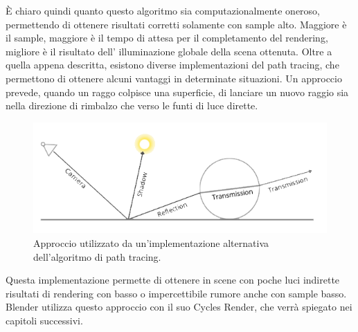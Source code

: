 È chiaro quindi quanto questo algoritmo sia computazionalmente oneroso, permettendo di ottenere risultati corretti solamente con sample alto. Maggiore è il sample, maggiore è il tempo di attesa per il completamento del rendering, migliore è il risultato dell’ illuminazione globale della scena ottenuta.
Oltre a quella appena descritta, esistono diverse implementazioni del path tracing, che permettono di ottenere alcuni vantaggi in determinate situazioni.
Un approccio prevede, quando un raggo colpisce una superficie, di lanciare un nuovo raggio sia nella direzione di rimbalzo che verso le funti di luce dirette.
\\
\begin{figure}[htb]
 \centering
 \includegraphics[width=0.8\linewidth]{images/chapter_stato_arte/stato_arte_path_alt.png}\hfill
 \caption[Path Tracing: implementazioni alternative]{Approccio utilizzato da un'implementazione alternativa dell'algoritmo di path tracing.}
 \label{fig:stato_arte_path_alt}
\end{figure}

Questa implementazione permette di ottenere in scene con poche luci indirette risultati di rendering con basso o impercettibile rumore anche con sample basso. 
Blender utilizza questo approccio con il suo Cycles Render, che verrà spiegato nei capitoli successivi.


